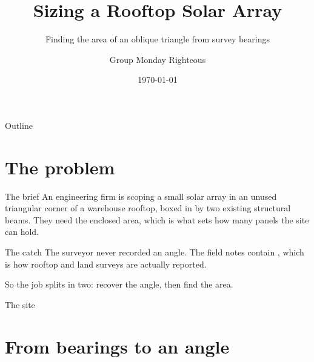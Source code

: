 \documentclass[11pt]{beamer}
\title[Rooftop Solar Array]{Sizing a Rooftop Solar Array}
\subtitle{Finding the area of an oblique triangle from survey bearings}
\author[Group MON]{Group Monday Righteous}
\institute[]{Trigonometry Group Activity}
\date{\today}   %
\begin{document}
\begin{frame}
  \titlepage
\end{frame}

\begin{frame}{Outline}
  \tableofcontents
\end{frame}

\section{The problem}

\begin{frame}{The brief}
  An engineering firm is scoping a small solar array in an unused triangular
  corner of a warehouse rooftop, boxed in by two existing structural beams.
  They need \alert{the enclosed area}, which is what sets how many panels the
  site can hold.

  \begin{block}{The catch}
    The surveyor never recorded an angle. The field notes contain
    , which is how rooftop and land surveys are
    actually reported.
  \end{block}

  So the job splits in two: recover the angle, then find the area.
\end{frame}

\begin{frame}{The site}
  \vfill
  \begin{center}
    \scalebox{0.85}{\diagRooftop}
  \end{center}
  \vfill
\end{frame}

\section{From bearings to an angle}
\end{document}
